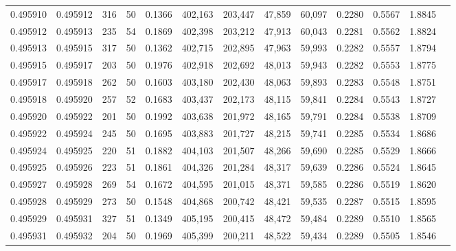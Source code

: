 \begin{tabular}{rrrrrrrrrrrrr}
0.495910 & 0.495912 &   316 &  50 &                                     0.1366 & 402,163 & 203,447 &  47,859 &  60,097 & 0.2280 & 0.5567 & 1.8845 \\
0.495912 & 0.495913 &   235 &  54 &                                     0.1869 & 402,398 & 203,212 &  47,913 &  60,043 & 0.2281 & 0.5562 & 1.8824 \\
0.495913 & 0.495915 &   317 &  50 &                                     0.1362 & 402,715 & 202,895 &  47,963 &  59,993 & 0.2282 & 0.5557 & 1.8794 \\
0.495915 & 0.495917 &   203 &  50 &                                     0.1976 & 402,918 & 202,692 &  48,013 &  59,943 & 0.2282 & 0.5553 & 1.8775 \\
0.495917 & 0.495918 &   262 &  50 &                                     0.1603 & 403,180 & 202,430 &  48,063 &  59,893 & 0.2283 & 0.5548 & 1.8751 \\
0.495918 & 0.495920 &   257 &  52 &                                     0.1683 & 403,437 & 202,173 &  48,115 &  59,841 & 0.2284 & 0.5543 & 1.8727 \\
0.495920 & 0.495922 &   201 &  50 &                                     0.1992 & 403,638 & 201,972 &  48,165 &  59,791 & 0.2284 & 0.5538 & 1.8709 \\
0.495922 & 0.495924 &   245 &  50 &                                     0.1695 & 403,883 & 201,727 &  48,215 &  59,741 & 0.2285 & 0.5534 & 1.8686 \\
0.495924 & 0.495925 &   220 &  51 &                                     0.1882 & 404,103 & 201,507 &  48,266 &  59,690 & 0.2285 & 0.5529 & 1.8666 \\
0.495925 & 0.495926 &   223 &  51 &                                     0.1861 & 404,326 & 201,284 &  48,317 &  59,639 & 0.2286 & 0.5524 & 1.8645 \\
0.495927 & 0.495928 &   269 &  54 &                                     0.1672 & 404,595 & 201,015 &  48,371 &  59,585 & 0.2286 & 0.5519 & 1.8620 \\
0.495928 & 0.495929 &   273 &  50 &                                     0.1548 & 404,868 & 200,742 &  48,421 &  59,535 & 0.2287 & 0.5515 & 1.8595 \\
0.495929 & 0.495931 &   327 &  51 &                                     0.1349 & 405,195 & 200,415 &  48,472 &  59,484 & 0.2289 & 0.5510 & 1.8565 \\
0.495931 & 0.495932 &   204 &  50 &                                     0.1969 & 405,399 & 200,211 &  48,522 &  59,434 & 0.2289 & 0.5505 & 1.8546 \\

\end{tabular}
